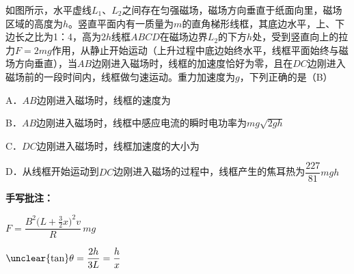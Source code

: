 \begin{problem}[18]
如图所示，水平虚线$L_1$、$L_2$之间存在匀强磁场，磁场方向垂直于纸面向里，磁场区域的高度为$h$。竖直平面内有一质量为$m$的直角梯形线框，其底边水平，上、下边长之比为1：4，高为$2h$线框$ABCD$在磁场边界$L_2$的下方$h$处，受到竖直向上的拉力$F=2mg$作用，从静止开始运动（上升过程中底边始终水平，线框平面始终与磁场方向垂直），当$AB$边刚进入磁场时，线框的加速度恰好为零，且在$DC$边刚进入磁场前的一段时间内，线框做匀速运动。重力加速度为$g$，下列正确的是（B）%


A．$AB$边刚进入磁场时，线框的速度为%

B．$AB$边刚进入磁场时，线框中感应电流的瞬时电功率为$mg\sqrt{2gh}$\ \unclear{$\checkmark$}%

C．$DC$边刚进入磁场时，线框加速度的大小为%

D．从线框开始运动到$DC$边刚进入磁场的过程中，线框产生的焦耳热为$\dfrac{227}{81}mgh$\ \red{$\checkmark$}%

\textbf{手写批注：}

$F=\dfrac{B^2\bigl(L+\frac{3}{2}x\bigr)^2v}{R}\,mg$%

$\unclear{\tan}\theta=\dfrac{2h}{3L}=\dfrac{h}{x}$\quad {}%
\end{problem}
